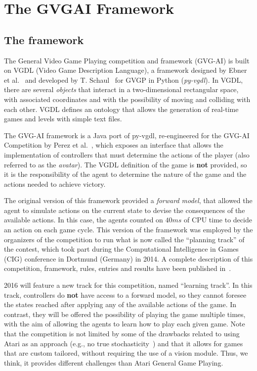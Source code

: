 \documentclass[conference]{IEEEtran}
\begin{document}
\section{The GVGAI Framework} \label{sec:framework}


\subsection{The framework} \label{ssec:framework}

The General Video Game Playing competition and framework (GVG-AI) is built on VGDL (Video Game Description Language), a framework designed by Ebner et al.~\cite{Ebner2013} and developed by T. Schaul~\cite{schaul2013pyvgdl} for GVGP in Python (\textit{py-vgdl}). In VGDL, there are several \textit{objects} that interact in a two-dimensional rectangular space, with associated coordinates and with the possibility of moving and colliding with each other. VGDL defines an ontology that allows the generation of real-time games and levels with simple text files.

The GVG-AI framework is a Java port of py-vgdl, re-engineered for the GVG-AI Competition by Perez et al.~\cite{Perez2015}, which exposes an interface that allows the implementation of controllers that must determine the actions of the player (also referred to as the \textit{avatar}). The VGDL definition of the game is \textbf{not} provided, so it is the responsibility of the agent to determine the nature of the game and the actions needed to achieve victory. 

The original version of this framework provided a \textit{forward model}, that allowed the agent to simulate actions on the current state to devise the consequences of the available actions. In this case, the agents counted on $40ms$ of CPU time to decide an action on each game cycle. This version of the framework was employed by the organizers of the competition to run what is now called the ``planning track'' of the contest, which took part during the Computational Intelligence in Games (CIG) conference in Dortmund (Germany) in 2014. A complete description of this competition, framework, rules, entries and results have been published in~\cite{Perez2015}.

2016 will feature a new track for this competition, named ``learning track''. In this track, controllers do \textbf{not} have access to a forward model, so they cannot foresee the states reached after applying any of the available actions of the game. In contrast, they will be offered the possibility of playing the game multiple times, with the aim of allowing the agents to learn how to play each given game. Note that the competition is not limited by some of the drawbacks related to using Atari as an approach (e.g., no true stochasticity~\cite{hausknecht2015impact}) and that it allows for games that are custom tailored, without requiring the use of a vision module. Thus, we think, it provides different challenges than Atari General Game Playing. 
\end{document}
